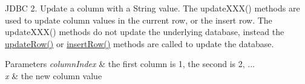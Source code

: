 J\+D\+BC 2. Update a column with a String value. The update\+X\+X\+X() methods are used to update column values in the current row, or the insert row. The update\+X\+X\+X() methods do not update the underlying database, instead the \mbox{\hyperlink{classcom_1_1mysql_1_1jdbc_1_1_updatable_result_set_a919969ba4b3c7cbc7b18605e9f31a746}{update\+Row()}} or \mbox{\hyperlink{classcom_1_1mysql_1_1jdbc_1_1_updatable_result_set_aef041f8d9d0778083716fc26652648fa}{insert\+Row()}} methods are called to update the database.


\begin{DoxyParams}{Parameters}
{\em column\+Index} & the first column is 1, the second is 2, ... \\
\hline
{\em x} & the new column value\\
\hline
\end{DoxyParams}

